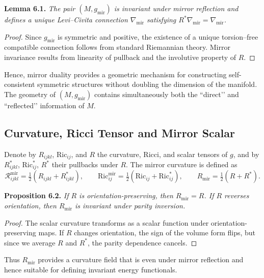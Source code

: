 \noindent
\textbf{Lemma 6.1.}
\emph{The pair \((M,g_{\mathrm{mir}})\) is invariant under mirror reflection
and defines a unique Levi–Civita connection \(\nabla_{\mathrm{mir}}\)
satisfying \(R^{*}\nabla_{\mathrm{mir}}=\nabla_{\mathrm{mir}}\).}

\begin{proof}
Since \(g_{\mathrm{mir}}\) is symmetric and positive,
the existence of a unique torsion–free compatible connection
follows from standard Riemannian theory.
Mirror invariance results from linearity of pullback and
the involutive property of \(R\).
\end{proof}

Hence, mirror duality provides a geometric mechanism
for constructing self-consistent symmetric structures
without doubling the dimension of the manifold.
The geometry of \((M,g_{\mathrm{mir}})\)
contains simultaneously both the “direct’’ and “reflected’’
information of \(M\).

\subsection{Curvature, Ricci Tensor and Mirror Scalar}\relax \hspace{0pt}

Denote by \(R_{ijkl}\), \(\mathrm{Ric}_{ij}\),
and \(R\) the curvature, Ricci, and scalar tensors of \(g\),
and by \(R^{*}_{ijkl}\), \(\mathrm{Ric}^{*}_{ij}\),
\(R^{*}\) their pullbacks under \(R\).
The mirror curvature is defined as
\begin{equation}
\mathcal{R}_{ijkl}^{\mathrm{mir}}
=\tfrac{1}{2}(R_{ijkl}+R^{*}_{ijkl}), \qquad
\mathrm{Ric}^{\mathrm{mir}}_{ij}
=\tfrac{1}{2}(\mathrm{Ric}_{ij}+\mathrm{Ric}^{*}_{ij}), \qquad
R_{\mathrm{mir}}=\tfrac{1}{2}(R+R^{*}).
\end{equation}

\noindent
\textbf{Proposition 6.2.}
\emph{If \(R\) is orientation-preserving, then
\(R_{\mathrm{mir}}=R\).
If \(R\) reverses orientation, then \(R_{\mathrm{mir}}\)
is invariant under parity inversion.}

\begin{proof}
The scalar curvature transforms as a scalar function
under orientation-preserving maps.
If \(R\) changes orientation, the sign of the volume form flips,
but since we average \(R\) and \(R^{*}\),
the parity dependence cancels.
\end{proof}

Thus \(R_{\mathrm{mir}}\) provides a curvature field
that is even under mirror reflection
and hence suitable for defining invariant energy functionals.

